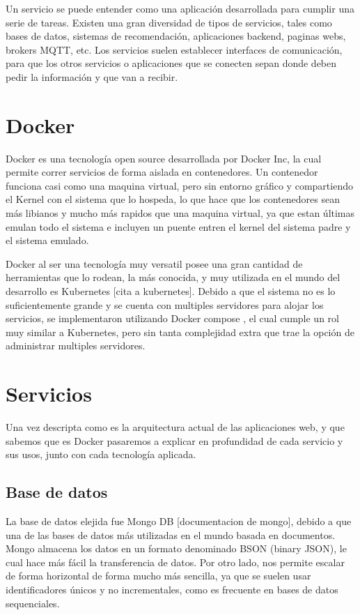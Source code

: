 Un servicio se puede entender como una aplicación desarrollada para cumplir una serie de tareas. Existen una gran diversidad de tipos de servicios, tales como bases de datos, sistemas de recomendación, aplicaciones backend, paginas webs, brokers MQTT, etc. Los servicios suelen establecer interfaces de comunicación, para que los otros servicios o aplicaciones que se conecten sepan donde deben pedir la información y que van a recibir.

\section{Docker}

Docker es una tecnología open source desarrollada por Docker Inc, la cual permite correr servicios de forma aislada en contenedores. Un contenedor funciona casi como una maquina virtual, pero sin entorno gráfico y compartiendo el Kernel \cite{keepcoding_que_2022} con el sistema que lo hospeda, lo que hace que los contenedores sean más libianos y mucho más rapidos que una maquina virtual, ya que estan últimas emulan todo el sistema e incluyen un puente entren el kernel del sistema padre y el sistema emulado.

Docker al ser una tecnología muy versatil posee una gran cantidad de herramientas que lo rodean, la más conocida, y muy utilizada en el mundo del desarrollo es Kubernetes [cita a kubernetes]. Debido a que el sistema no es lo suficientemente grande y se cuenta con multiples servidores para alojar los servicios, se implementaron utilizando Docker compose \cite{docker_inc_docker_2023}, el cual cumple un rol muy similar a Kubernetes, pero sin tanta complejidad extra que trae la opción de administrar multiples servidores.

\section{Servicios}

Una vez descripta como es la arquitectura actual de las aplicaciones web, y que sabemos que es Docker pasaremos a explicar en profundidad de cada servicio y sus usos, junto con cada tecnología aplicada.

\subsection{Base de datos}

La base de datos elejida fue Mongo DB [documentacion de mongo], debido a que una de las bases de datos más utilizadas en el mundo basada en documentos. Mongo almacena los datos en un formato denominado BSON (binary JSON), le cual hace más fácil la transferencia de datos. Por otro lado, nos permite escalar de forma horizontal de forma mucho más sencilla, ya que se suelen usar identificadores únicos y no incrementales, como es frecuente en bases de datos sequenciales.

